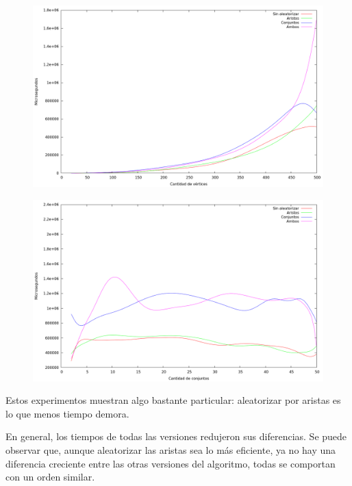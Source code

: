 \begin{figure}[H]
  \begin{center}
    \includegraphics[scale=0.35]{imagenes/grasp-local-n-tiempo.png}
  \end{center}
\end{figure}

\begin{figure}[H]
  \begin{center}
    \includegraphics[scale=0.35]{imagenes/grasp-local-k-tiempo.png}
  \end{center}
\end{figure}

Estos experimentos muestran algo bastante particular: aleatorizar por aristas
es lo que menos tiempo demora.

En general, los tiempos de todas las versiones redujeron sus diferencias. Se
puede observar que, aunque aleatorizar las aristas sea lo más eficiente, ya no
hay una diferencia creciente entre las otras versiones del algoritmo, todas
se comportan con un orden similar.

